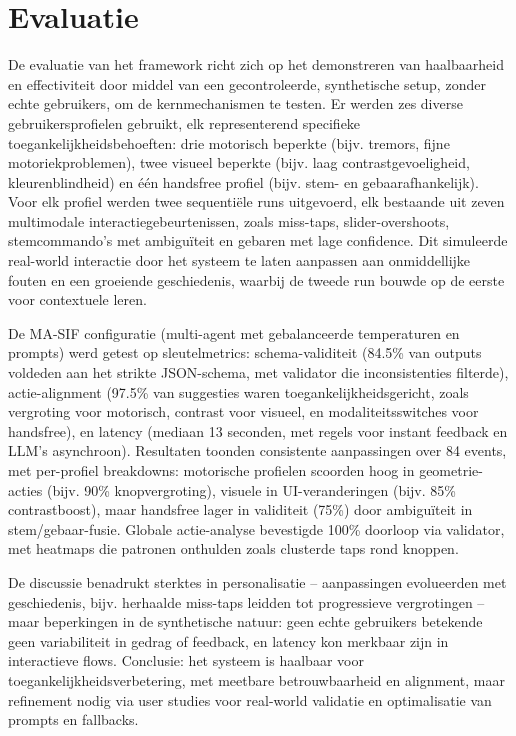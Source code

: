 \documentclass[openany]{book}
\begin{document}
\section*{Evaluatie}
De evaluatie van het framework richt zich op het demonstreren van haalbaarheid en effectiviteit door middel van een gecontroleerde, synthetische setup, zonder echte gebruikers, om de kernmechanismen te testen. Er werden zes diverse gebruikersprofielen gebruikt, elk representerend specifieke toegankelijkheidsbehoeften: drie motorisch beperkte (bijv. tremors, fijne motoriekproblemen), twee visueel beperkte (bijv. laag contrastgevoeligheid, kleurenblindheid) en één handsfree profiel (bijv. stem- en gebaarafhankelijk). Voor elk profiel werden twee sequentiële runs uitgevoerd, elk bestaande uit zeven multimodale interactiegebeurtenissen, zoals miss-taps, slider-overshoots, stemcommando's met ambiguïteit en gebaren met lage confidence. Dit simuleerde real-world interactie door het systeem te laten aanpassen aan onmiddellijke fouten en een groeiende geschiedenis, waarbij de tweede run bouwde op de eerste voor contextuele leren.

De MA-SIF configuratie (multi-agent met gebalanceerde temperaturen en prompts) werd getest op sleutelmetrics: schema-validiteit (84.5\% van outputs voldeden aan het strikte JSON-schema, met validator die inconsistenties filterde), actie-alignment (97.5\% van suggesties waren toegankelijkheidsgericht, zoals vergroting voor motorisch, contrast voor visueel, en modaliteitsswitches voor handsfree), en latency (mediaan 13 seconden, met regels voor instant feedback en LLM's asynchroon). Resultaten toonden consistente aanpassingen over 84 events, met per-profiel breakdowns: motorische profielen scoorden hoog in geometrie-acties (bijv. 90\% knopvergroting), visuele in UI-veranderingen (bijv. 85\% contrastboost), maar handsfree lager in validiteit (75\%) door ambiguïteit in stem/gebaar-fusie. Globale actie-analyse bevestigde 100\% doorloop via validator, met heatmaps die patronen onthulden zoals clusterde taps rond knoppen.

De discussie benadrukt sterktes in personalisatie – aanpassingen evolueerden met geschiedenis, bijv. herhaalde miss-taps leidden tot progressieve vergrotingen – maar beperkingen in de synthetische natuur: geen echte gebruikers betekende geen variabiliteit in gedrag of feedback, en latency kon merkbaar zijn in interactieve flows. Conclusie: het systeem is haalbaar voor toegankelijkheidsverbetering, met meetbare betrouwbaarheid en alignment, maar refinement nodig via user studies voor real-world validatie en optimalisatie van prompts en fallbacks.
\end{document}
